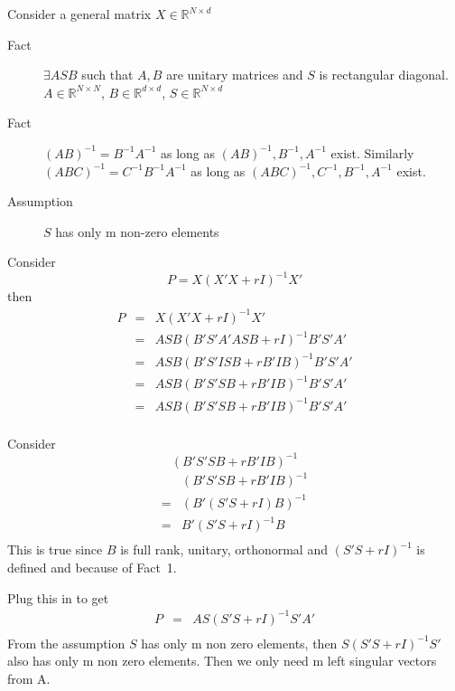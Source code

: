 \documentclass[11pt]{article}
\begin{document}
\raggedright
Consider a general matrix $X \in \mathbb{R}^{N \times d}$
\begin{description}
\item[Fact] $\exists A S B$ such that $A, B$ are unitary matrices and $S$ is
  rectangular diagonal. $A \in \mathbb{R}^{N \times N}$, $B \in
  \mathbb{R}^{d \times d}$, $S \in \mathbb{R}^{N \times d}$
\item[Fact] $(AB)^{-1} = B^{-1}A^{-1}$ as long as $(AB)^{-1}, B^{-1},
  A^{-1}$ exist. Similarly $(ABC)^{-1} = C^{-1}B^{-1}A^{-1}$ as long
  as $(ABC)^{-1}, C^{-1}, B^{-1}, A^{-1}$ exist.
\item[Assumption] $S$ has only m non-zero elements
\end{description}
Consider $$P = X(X'X+rI)^{-1}X'$$ then
\begin{eqnarray}
  P &=& X(X'X+rI)^{-1}X'\\
  &=&  ASB(B'S'A'ASB + rI)^{-1}B'S'A'\\
  &=&  ASB(B'S'ISB + rB'IB)^{-1}B'S'A'\\
  &=&  ASB(B'S'SB + rB'IB)^{-1}B'S'A'\\
  &=&  ASB(B'S'SB + rB'IB)^{-1}B'S'A'\\
\end{eqnarray}

Consider $$(B'S'SB + rB'IB)^{-1}$$
\begin{eqnarray*}
  &(B'S'SB + rB'IB)^{-1}\\
  =& (B'(S'S + rI)B)^{-1}\\
  =& B'(S'S + rI)^{-1}B\\
\end{eqnarray*}
This is true since $B$ is full rank, unitary, orthonormal and $(S'S +
rI)^{-1}$ is defined and because of Fact~1.

Plug this in to get
\begin{eqnarray}
  P &=& AS(S'S + rI)^{-1}S'A'\\
\end{eqnarray}
From the assumption $S$ has only m non zero elements, then $S(S'S +
rI)^{-1}S'$ also has only m non zero elements. Then we only need m
left singular vectors from A.
\end{document}
